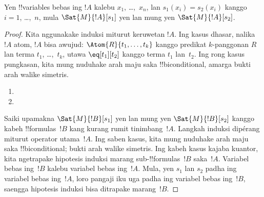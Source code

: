 \documentclass[../../../include/open-logic-section]{subfiles}
\begin{document}
\begin{prop}
Yen !!{variable}s bebas ing $!A$ kalebu $x_1$, \dots,~$x_n$, lan
$s_1(x_i) = s_2(x_i)$ kanggo $i = 1$, \dots,~$n$, mula $\Sat{M}{!A}[s_1]$
yen lan mung yen $\Sat{M}{!A}[s_2]$.
\end{prop}

\begin{proof}
Kita nggunakake induksi miturut keruwetan $!A$. Ing kasus dhasar,
nalika $!A$ atom, $!A$ bisa awujud:
$\Atom{R}{t_1, \dots, t_k}$ kanggo predikat $k$-panggonan $R$
lan terma $t_1$, \dots,~$t_k$, utawa $\eq[t_1][t_2]$ kanggo terma
$t_1$ lan~$t_2$. Ing rong kasus pungkasan, kita mung nuduhake
arah maju saka !!{biconditional}, amarga bukti arah walike simetris.

\begin{enumerate}


\item
\item
\end{enumerate}

Saiki upamakna $\Sat{M}{!B}[s_1]$ yen lan mung yen
$\Sat{M}{!B}[s_2]$ kanggo kabeh !!{formula}s~$!B$
kang kurang rumit tinimbang~$!A$. Langkah induksi dipérang
miturut operator utama~$!A$. Ing saben kasus, kita mung
nuduhake arah maju saka !!{biconditional}; bukti arah
walike simetris. Ing kabeh kasus kajaba kuantor, kita
ngetrapake hipotesis induksi marang sub-!!{formula}s~$!B$
saka~$!A$. Variabel bebas ing~$!B$ kalebu variabel bebas
ing~$!A$. Mula, yen $s_1$ lan $s_2$ padha ing variabel bebas
ing~$!A$, loro pangaji iku uga padha ing variabel bebas
ing~$!B$, saengga hipotesis induksi bisa ditrapake marang~$!B$.


\end{proof}
\end{document}
